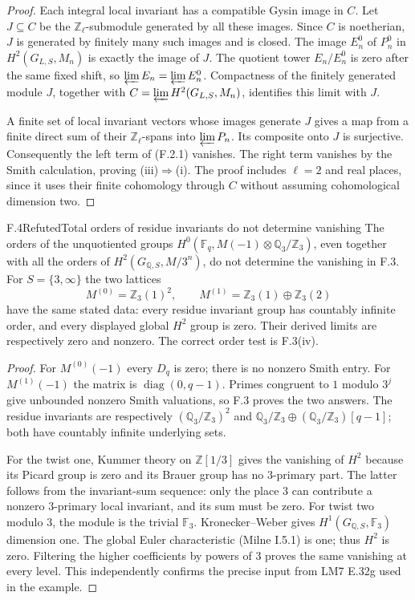\begin{proof}
Each integral local invariant has a compatible Gysin image in $C$. Let $J\subseteq C$ be the $\mathbb Z_\ell$-submodule generated by all these images. Since $C$ is noetherian, $J$ is generated by finitely many such images and is closed. The image $E_n^0$ of $P_n^0$ in $H^2(G_{L,S},M_n)$ is exactly the image of $J$. The quotient tower $E_n/E_n^0$ is zero after the same fixed shift, so $\varprojlim E_n=\varprojlim E_n^0$. Compactness of the finitely generated module $J$, together with $C=\varprojlim H^2(G_{L,S},M_n)$, identifies this limit with $J$.

A finite set of local invariant vectors whose images generate $J$ gives a map from a finite direct sum of their $\mathbb Z_\ell$-spans into $\varprojlim P_n$. Its composite onto $J$ is surjective. Consequently the left term of (F.2.1) vanishes. The right term vanishes by the Smith calculation, proving (iii)$\Rightarrow$(i). The proof includes $\ell=2$ and real places, since it uses their finite cohomology through $C$ without assuming cohomological dimension two.
\end{proof}

\begin{statement}{F.4}{Refuted}{Total orders of residue invariants do not determine vanishing}
The orders of the unquotiented groups
$H^0(\mathbb F_q,M(-1)\otimes\mathbb Q_3/\mathbb Z_3)$, even together with all the orders of $H^2(G_{\mathbb Q,S},M/3^n)$, do not determine the vanishing in F.3.
For $S=\{3,\infty\}$ the two lattices
\[
 M^{(0)}=\mathbb Z_3(1)^2,\qquad
 M^{(1)}=\mathbb Z_3(1)\oplus\mathbb Z_3(2)
\]
have the same stated data: every residue invariant group has countably infinite order, and every displayed global $H^2$ group is zero.
Their derived limits are respectively zero and nonzero. The correct order test is F.3(iv).
\end{statement}
\begin{proof}
For $M^{(0)}(-1)$ every $D_q$ is zero; there is no nonzero Smith entry. For $M^{(1)}(-1)$ the matrix is $\operatorname{diag}(0,q-1)$. Primes congruent to $1$ modulo $3^j$ give unbounded nonzero Smith valuations, so F.3 proves the two answers. The residue invariants are respectively $(\mathbb Q_3/\mathbb Z_3)^2$ and
$\mathbb Q_3/\mathbb Z_3\oplus(\mathbb Q_3/\mathbb Z_3)[q-1]$; both have countably infinite underlying sets.

For the twist one, Kummer theory on $\mathbb Z[1/3]$ gives the vanishing of $H^2$ because its Picard group is zero and its Brauer group has no $3$-primary part. The latter follows from the invariant-sum sequence: only the place $3$ can contribute a nonzero $3$-primary local invariant, and its sum must be zero. For twist two modulo $3$, the module is the trivial $\mathbb F_3$. Kronecker--Weber gives $H^1(G_{\mathbb Q,S},\mathbb F_3)$ dimension one. The global Euler characteristic (Milne I.5.1) is one; thus $H^2$ is zero. Filtering the higher coefficients by powers of $3$ proves the same vanishing at every level. This independently confirms the precise input from LM7 E.32g used in the example.
\end{proof}

